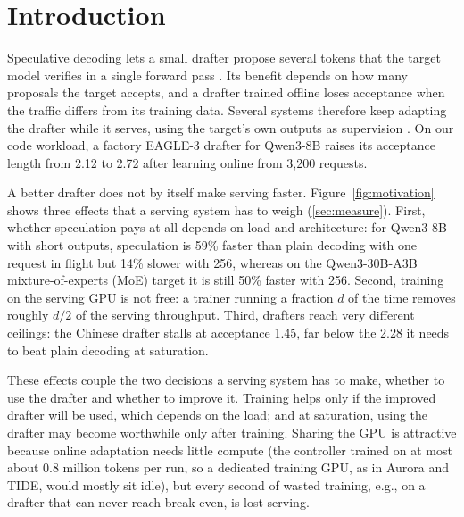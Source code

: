 \documentclass{article}
\begin{document}
\section{Introduction}\label{sec:intro}

Speculative decoding lets a small drafter propose several tokens that the target model verifies in a single forward pass \citep{leviathan2023fast,chen2023accelerating}. Its benefit depends on how many proposals the target accepts, and a drafter trained offline loses acceptance when the traffic differs from its training data. Several systems therefore keep adapting the drafter while it serves, using the target's own outputs as supervision \citep{liu2024osd,qian2026drafts,wang2026aurora,park2026tide}. On our code workload, a factory EAGLE-3 drafter for Qwen3-8B raises its acceptance length from 2.12 to 2.72 after learning online from 3{,}200 requests.

A better drafter does not by itself make serving faster. Figure~\ref{fig:motivation} shows three effects that a serving system has to weigh (\cref{sec:measure}). First, whether speculation pays at all depends on load and architecture: for Qwen3-8B with short outputs, speculation is 59\% faster than plain decoding with one request in flight but 14\% slower with 256, whereas on the Qwen3-30B-A3B mixture-of-experts (MoE) target it is still 50\% faster with 256. Second, training on the serving GPU is not free: a trainer running a fraction $d$ of the time removes roughly $d/2$ of the serving throughput. Third, drafters reach very different ceilings: the Chinese drafter stalls at acceptance 1.45, far below the 2.28 it needs to beat plain decoding at saturation.

These effects couple the two decisions a serving system has to make, whether to use the drafter and whether to improve it. Training helps only if the improved drafter will be used, which depends on the load; and at saturation, using the drafter may become worthwhile only after training. Sharing the GPU is attractive because online adaptation needs little compute (the controller trained on at most about 0.8 million tokens per run, so a dedicated training GPU, as in Aurora and TIDE, would mostly sit idle), but every second of wasted training, e.g., on a drafter that can never reach break-even, is lost serving.
\end{document}
